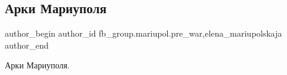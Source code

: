  
 
 
 
 

\subsection{Арки Мариуполя}
\label{sec:27_02_2023.fb.fb_group.mariupol.pre_war.4.arki_mariupolya}
 
\ifcmt
 author_begin
   author_id fb_group.mariupol.pre_war,elena_mariupolskaja
 author_end
\fi

Арки Мариуполя.

